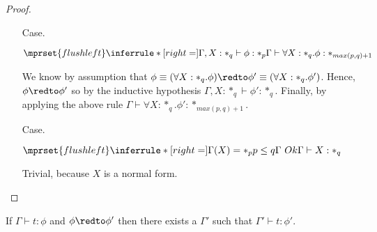 \begin{proof}
\begin{itemize}
\item[Case.]\ \\
  \begin{center}
    \begin{math}
      $$\mprset{flushleft}
      \inferrule* [right=] {
        \Gamma,X : *_q \vdash \phi : *_p
      }{\Gamma \vdash \forall X:*_q.\phi : *_{max(p,q)+1}}
    \end{math}
  \end{center}
  We know by assumption that $\phi \equiv (\forall X:*_q.\phi) \redto \phi' \equiv (\forall X:*_q.\phi')$.  Hence,
  $\phi \redto \phi'$ so by the inductive hypothesis $\Gamma,X:*_q \vdash \phi' : *_q$.  Finally, by applying the
  above rule $\Gamma \vdash \forall X:*_q.\phi':*_{max(p,q)+1}$.

\item[Case.]\ \\
  \begin{center}
    \begin{math}
      $$\mprset{flushleft}
      \inferrule* [right=] {
        \Gamma(X) = *_p
        \\
        p \leq q
        \\
        \Gamma\ Ok
      }{\Gamma \vdash X : *_q}
    \end{math} 
  \end{center}
  Trivial, because $X$ is a normal form.
\end{itemize}
\end{proof}
\begin{lemma}
  \label{lemma:preservation_2}
  If $\Gamma \vdash t:\phi$ and $\phi \redto \phi'$ then there exists a $\Gamma'$ such that $\Gamma' \vdash t:\phi'$.
\end{lemma}

